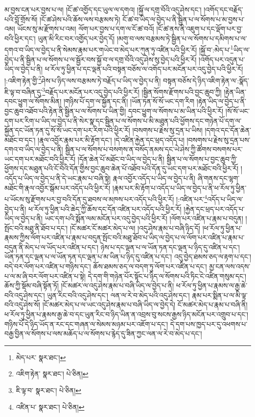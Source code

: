 མ་བྱས་ངན་པར་བྱས་པ་ལ། །ངོ་ཚ་འགྱོད་དང་ཡུལ་ལ་དགའ། །སྐྱོ་ལ་དགྲ་བོའི་འདུ་ཤེས་དང་། །འགོད་དང་བརྗོད་པའི་བློ་གྲོས་སོ། །ངོ་ཚ་ཤེས་པའི་ཆོས་ལས་བརྩམས་ཏེ། ངོ་ཚ་བ་ཡིད་ལ་བྱེད་པ་ནི་སྦྱིན་པ་ལ་སོགས་པ་མ་བྱས་པ་འམ། ཡོངས་སུ་མ་རྫོགས་པ་འམ། ལོག་པར་བྱས་པ་དག་ལ་ངོ་ཚ་བའོ། །ངོ་ཚ་ནས་ནི་འཇུག་པ་དང་ལྡོག་པར་བྱ་བའི་ཕྱིར་དང་། ཡུན་མི་རིང་བར་འགྱོད་པར་བྱེད་དོ། །མགུ་བ་ལས་བརྩམས་ཏེ་སྦྱིན་པ་ལ་སོགས་པ་དམིགས་པ་ལ་དགའ་བ་ཡིད་ལ་བྱེད་པ་ནི་སེམས་རྣམ་པར་གཡེང་བ་མེད་པར་ཀུན་ཏུ་འཛིན་པའི་ཕྱིར་རོ། །སྐྱོ་བ་:མེད་པ་\footnote{མེད་པར་  སྣར་ཐང་། }ཡིད་ལ་བྱེད་པ་ནི་སྦྱིན་པ་ལ་སོགས་པ་ལ་སྦྱོར་བས་སྐྱོ་བ་ལ་དགྲ་བོའི་འདུ་ཤེས་སུ་བྱེད་པའི་ཕྱིར་རོ། །འགོད་པར་འདུན་པ་ཡིད་ལ་བྱེད་པ་ནི། ཕ་རོལ་ཏུ་ཕྱིན་པ་དང་ལྡན་པའི་བསྟན་བཅོས་ལ་འགོད་པར་མངོན་པར་འདུ་བྱེད་པའི་ཕྱིར་རོ། །:འཇིག་རྟེན་གྱི་\footnote{འཇིག་རྟེན་  སྣར་ཐང་།  པེ་ཅིན། }ཤེས་པ་ཉིད་ལས་བརྩམས་ཏེ་བརྗོད་པ་ཡིད་ལ་བྱེད་པ་ནི། བསྟན་བཅོས་དེ་ཉིད་འཇིག་རྟེན་ལ་:སྣོད་ཇི་ལྟ་བ་བཞིན་དུ་\footnote{ཇི་ལྟ་བ་  སྣར་ཐང་།  པེ་ཅིན། }བརྗོད་པར་མངོན་པར་འདུ་བྱེད་པའི་ཕྱིར་རོ། །སྦྱིན་སོགས་རྫོགས་པའི་བྱང་ཆུབ་ཀྱི། །རྟེན་ཡིན་དབང་ཕྱུག་ལ་སོགས་མིན། །གཉིས་པོ་དག་ལ་སྐྱོན་དང་ནི། །ཡོན་ཏན་སོ་སོ་ཡང་དག་རིག །རྟེན་ཡིད་ལ་བྱེད་པ་ནི་བྱང་ཆུབ་འཐོབ་པའི་རྟེན་ནི་སྦྱིན་པ་ལ་སོགས་པ་ཡིན་གྱི། དབང་ཕྱུག་ལ་སོགས་པ་མ་ཡིན་པའི་ཕྱིར་རོ། །སོ་སོ་ཡང་དག་པར་རིག་པ་ཡིད་ལ་བྱེད་པ་ནི་སེར་སྣ་དང་སྦྱིན་པ་ལ་སོགས་པ་མི་མཐུན་པའི་ཕྱོགས་དང་གཉེན་པོ་དག་ལ་སྐྱོན་དང་ཡོན་ཏན་དུ་སོ་སོ་ཡང་དག་པར་རིག་པའི་ཕྱིར་རོ། །བསགས་པ་རྗེས་སུ་དྲན་པ་ཡིས། །དགའ་དང་དོན་ཆེན་མཐོང་བ་དང་། །རྣལ་འབྱོར་རྣམ་པར་མི་རྟོག་དང་། །དེ་འཛིན་རྐྱེན་དང་ཕྲད་འདོད་པ། །བསགས་པ་རྗེས་སུ་དྲན་པས་དགའ་བ་ཡིད་ལ་བྱེད་པ་ནི། སྦྱིན་པ་ལ་སོགས་པ་བསགས་ན་བསོད་ནམས་དང་ཡེ་ཤེས་ཀྱི་ཚོགས་བསགས་པར་ཡང་དག་པར་མཐོང་བའི་ཕྱིར་རོ། །དོན་ཆེན་པོ་མཐོང་བ་ཡིད་ལ་བྱེད་པ་ནི། སྦྱིན་པ་ལ་སོགས་པ་བྱང་ཆུབ་ཀྱི་ཕྱོགས་དང་མཐུན་པའི་ངོ་བོའི་དོན་གྱིས་བྱང་ཆུབ་ཆེན་པོ་འཐོབ་པའི་དོན་དུ་ཡང་དག་པར་མཐོང་བའི་ཕྱིར་རོ། །འདོད་པ་ཡིད་ལ་བྱེད་པ་ནི་དེ་ཡང་རྣམ་པ་བཞི་སྟེ། རྣལ་འབྱོར་འདོད་པ་ཡིད་ལ་བྱེད་པ་ནི། ཞི་གནས་དང་ལྷག་མཐོང་གི་རྣལ་འབྱོར་སྒོམ་པར་འདོད་པའི་ཕྱིར་རོ། །རྣམ་པར་མི་རྟོག་པ་འདོད་པ་ཡིད་ལ་བྱེད་པ་ནི་ཕ་རོལ་ཏུ་ཕྱིན་པ་ཡོངས་སུ་རྫོགས་པར་བྱ་བའི་དོན་དུ་ཐབས་ལ་མཁས་པར་འདོད་པའི་ཕྱིར་རོ། །:འཛིན་པར་\footnote{འཛིན་པ་  སྣར་ཐང་།  པེ་ཅིན། }འདོད་པ་ཡིད་ལ་བྱེད་པ་ནི། ཕ་རོལ་ཏུ་ཕྱིན་པའི་ཆེད་ཀྱི་ཆོས་དང་དོན་འཛིན་པར་འདོད་པའི་ཕྱིར་རོ། །རྐྱེན་དང་ཕྲད་པར་འདོད་པ་ཡིད་ལ་བྱེད་པ་ནི། ཡང་དག་པའི་སྨོན་ལམ་མངོན་པར་འདུ་བྱེད་པའི་ཕྱིར་རོ། །ལོག་པར་འཛིན་པ་རྣམ་པ་བདུན། །སྤོང་བའི་མཐུ་ནི་ཐོབ་པ་དང་། །ངོ་མཚར་ངོ་མཚར་མེད་པ་ལ། །འདུ་ཤེས་རྣམ་པ་བཞི་ཉིད་དོ། །ཕ་རོལ་ཏུ་ཕྱིན་པ་རྣམས་ཀྱིས་ལོག་པར་འཛིན་པ་རྣམ་པ་བདུན་སྤོང་བའི་མཐུ་ཐོབ་པ་ཡིད་ལ་བྱེད་པ་ལ་ལོག་པར་འཛིན་པ་རྣམ་པ་བདུན་ནི་མེད་པ་ལ་ཡོད་པར་འཛིན་པ་དང་། ཉེས་པ་དང་ལྡན་པ་ལ་ཡོན་ཏན་དང་ལྡན་པ་ཉིད་དུ་འཛིན་པ་དང་། ཡོན་ཏན་དང་ལྡན་པ་ལ་ཡོན་ཏན་དང་ལྡན་པ་མ་ཡིན་པ་ཉིད་དུ་འཛིན་པ་དང་། འདུ་བྱེད་ཐམས་ཅད་ལ་རྟག་པ་དང་། བདེ་བར་ལོག་པར་འཛིན་པ་གཉིས་དང་། ཆོས་ཐམས་ཅད་ལ་བདག་ཏུ་ལོག་པར་འཛིན་པ་དང་། མྱ་ངན་ལས་འདས་པ་ལ་མ་ཞི་བར་ལོག་པར་འཛིན་པ་སྟེ། དེ་དག་གི་གཉེན་པོར་སྟོང་པ་ཉིད་ལ་སོགས་པའི་ཏིང་ངེ་འཛིན་གསུམ་དང་། ཆོས་ཀྱི་སྡོམ་བཞི་སྟོན་ཏོ། །ངོ་མཚར་ལ་འདུ་ཤེས་རྣམ་པ་བཞི་ཡིད་ལ་བྱེད་པ་ནི། ཕ་རོལ་ཏུ་ཕྱིན་པ་རྣམས་ལ་རྒྱ་ཆེ་བའི་འདུ་ཤེས་དང་། ཡུན་རིང་བའི་འདུ་ཤེས་དང་། ལན་ལ་རེ་བ་མེད་པའི་འདུ་ཤེས་དང་། རྣམ་པར་སྨིན་པ་ལ་མི་ལྟ་བའི་འདུ་ཤེས་སོ། །ངོ་མཚར་མེད་པ་ལ་ཡང་འདུ་ཤེས་རྣམ་པ་བཞི་ཡིད་ལ་བྱེད་དེ། ངོ་མཚར་མེད་པ་རྣམ་པ་བཞི་ནི། ཕ་རོལ་ཏུ་ཕྱིན་པ་རྣམས་རྒྱ་ཆེ་བ་དང་ཡུན་རིང་བ་ཉིད་ཡིན་ན་འབྲས་བུ་སངས་རྒྱས་ཉིད་མངོན་པར་འགྲུབ་པ་དང་། གཉིས་པོ་དེ་ཉིད་ཡོད་ན་རང་དང་གཞན་ལ་སེམས་མཉམ་པར་འཇོག་པ་དང་། དེ་དག་པས་ཁྱད་པར་དུ་འཕགས་པ་བརྒྱ་བྱིན་ལ་སོགས་པ་ལས་མཆོད་པ་ལ་སོགས་པ་རྙེད་དུ་ཟིན་ཀྱང་ལན་ལ་རེ་བ་མེད་པ་དང་། 
